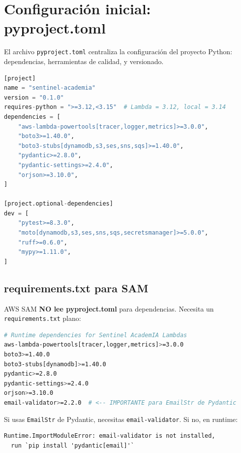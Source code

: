\documentclass[11pt,a4paper,oneside]{article}
\newcommand{\filename}[1]{\texttt{\small #1}}
\begin{document}
\section{Configuraci\'on inicial: pyproject.toml}

El archivo \filename{pyproject.toml} centraliza la configuraci\'on del proyecto Python: dependencias, herramientas de calidad, y versionado.

\begin{lstlisting}[language=Python,caption={pyproject.toml (deps runtime)}]
[project]
name = "sentinel-academia"
version = "0.1.0"
requires-python = ">=3.12,<3.15"  # Lambda = 3.12, local = 3.14
dependencies = [
    "aws-lambda-powertools[tracer,logger,metrics]>=3.0.0",
    "boto3>=1.40.0",
    "boto3-stubs[dynamodb,s3,ses,sns,sqs]>=1.40.0",
    "pydantic>=2.8.0",
    "pydantic-settings>=2.4.0",
    "orjson>=3.10.0",
]

[project.optional-dependencies]
dev = [
    "pytest>=8.3.0",
    "moto[dynamodb,s3,ses,sns,sqs,secretsmanager]>=5.0.0",
    "ruff>=0.6.0",
    "mypy>=1.11.0",
]
\end{lstlisting}

\subsection{requirements.txt para SAM}

AWS SAM \textbf{NO lee pyproject.toml} para dependencias. Necesita un \filename{requirements.txt} plano:

\begin{lstlisting}[language=bash,caption={src/requirements.txt}]
# Runtime dependencies for Sentinel AcademIA Lambdas
aws-lambda-powertools[tracer,logger,metrics]>=3.0.0
boto3>=1.40.0
boto3-stubs[dynamodb]>=1.40.0
pydantic>=2.8.0
pydantic-settings>=2.4.0
orjson>=3.10.0
email-validator>=2.2.0  # <-- IMPORTANTE para EmailStr de Pydantic
\end{lstlisting}

\begin{tcolorbox}[colback=errred!5!white,colframe=errred,title={Trampa \#1: email-validator}]
Si usas \texttt{EmailStr} de Pydantic, necesitas \texttt{email-validator}. Si no, en runtime:
\begin{lstlisting}
Runtime.ImportModuleError: email-validator is not installed,
  run `pip install 'pydantic[email]'`
\end{lstlisting}
\end{tcolorbox}
\end{document}
